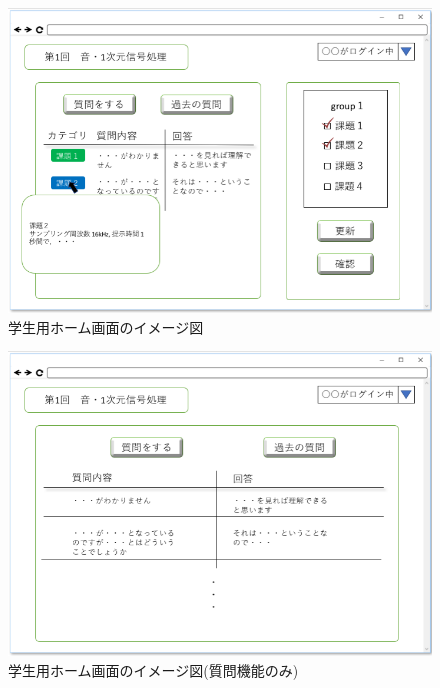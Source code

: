 \begin{figure}[htbp]
\begin{center}
  \includegraphics[width=1\linewidth,clip]{./img/28.png}
  \caption{学生用ホーム画面のイメージ図}\label{fig:28}
\end{center}
\end{figure}

\begin{figure}[htbp]
\begin{center}
  \includegraphics[width=1\linewidth,clip]{./img/29.png}
  \caption{学生用ホーム画面のイメージ図(質問機能のみ)}\label{fig:29}
\end{center}
\end{figure}

